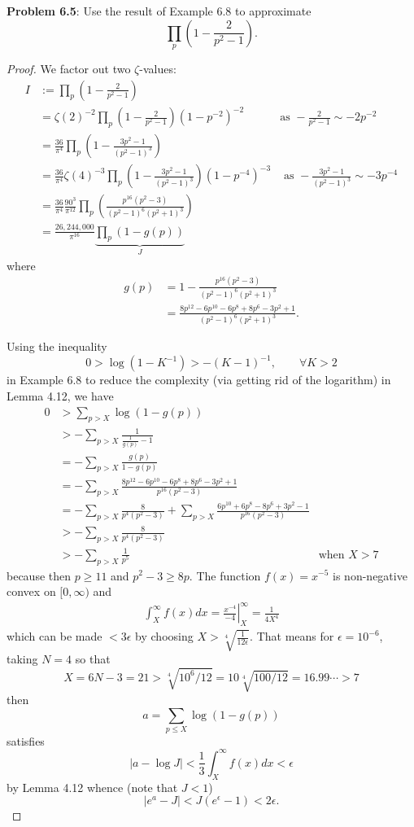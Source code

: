 \documentclass[12pt]{article}
\begin{document}
\fi

\textbf{Problem 6.5}: Use the result of Example 6.8 to approximate
$$\prod_p \left(1 - \frac{2}{p^2 - 1} \right).$$

\begin{proof}
We factor out two $\zeta$-values:
\begin{align*}
I &:= \prod_p \left(1 - \frac{2}{p^2 - 1} \right)\\
&= \zeta(2)^{-2} \prod_p \left(1 - \frac{2}{p^2 - 1} \right) (1 - p^{-2})^{-2} &\text{as } -\frac{2}{p^2 - 1} \sim -2p^{-2}\\
&= \frac{36}{\pi^4} \prod_p \left(1 - \frac{3p^2 - 1}{(p^2 - 1)^3} \right)\\
&= \frac{36}{\pi^4} \zeta(4)^{-3} \prod_p \left(1 - \frac{3p^2 - 1}{(p^2 - 1)^3} \right) (1 - p^{-4})^{-3} &\text{ as } - \frac{3p^2 - 1}{(p^2 - 1)^3} \sim -3 p^{-4}\\
&= \frac{36}{\pi^4} \frac{90^3}{\pi^{12}} \prod_p \left(\frac{p^{16} (p^2 - 3) }{(p^2 - 1)^6 (p^2 + 1)^3} \right)\\
&= \frac{26,244,000}{\pi^{16}} \underbrace{\prod_p \left( 1 - g(p) \right)}_{J}
\end{align*}
where
\begin{align*}
g(p) &= 1 - \frac{ p^{16} (p^2 - 3) }{(p^2 - 1)^6 (p^2 + 1)^3} \\
&= \frac{8 p^{12} - 6 p^{10} - 6 p^8 + 8 p^6 - 3 p^2 + 1}{(p^2 - 1)^6 (p^2 + 1)^3}.
\end{align*}

Using the inequality
$$0 > \log(1 - K^{-1}) > -(K-1)^{-1}, \qquad \forall K > 2$$
in Example 6.8 to reduce the complexity (via getting rid of the logarithm) in Lemma 4.12, we have
\begin{align*}
0 &> \sum_{p > X} \log(1 - g(p))\\
&> - \sum_{p > X} \frac{1}{\frac{1}{g(p)} - 1}\\
&= - \sum_{p > X} \frac{g(p)}{1 - g(p)}\\
&= - \sum_{p > X} \frac{8 p^{12} - 6 p^{10} - 6 p^8 + 8 p^6 - 3 p^2 + 1}{p^{16} (p^2 - 3)}\\
&= - \sum_{p > X} \frac{8}{p^4 (p^2 - 3)} + \sum_{p > X} \frac{6 p^{10} +6 p^8 - 8 p^6 + 3 p^2 - 1}{p^{16} (p^2 - 3)}\\
&> - \sum_{p > X} \frac{8}{p^4 (p^2 - 3)}\\
&> - \sum_{p > X} \frac{1}{p^5} &\text{when } X > 7
\end{align*}
because then $p \geq 11$ and $p^2 - 3 \geq 8p$. %
The function $f(x) = x^{-5}$ is non-negative convex on $[0, \infty)$ and
\begin{align*}
\int_X^\infty f(x) dx = \left.\frac{x^{-4}}{-4} \right|_X^\infty = \frac{1}{4 X^4}
\end{align*}
which can be made $< 3 \epsilon$ by choosing $X > \sqrt[4]{\frac{1}{12\epsilon}}$. That means for $\epsilon = 10^{-6}$, taking $N = 4$ so that
$$X = 6N - 3 = 21 > \sqrt[4]{10^6 / 12} = 10 \sqrt[4]{100/12} = 16.99\cdots > 7$$
then
$$a = \sum_{p \leq X} \log(1 - g(p))$$
satisfies
$$|a - \log J| < \frac{1}{3} \int_X^\infty f(x) dx < \epsilon$$
by Lemma 4.12 whence (note that $J < 1$)
$$|e^a - J| < J (e^\epsilon - 1) < 2 \epsilon.$$


\end{proof}
\end{document}
